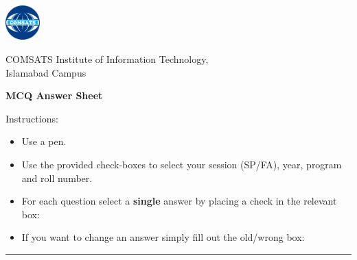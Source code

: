 \documentclass[english,a4paper,oneside]{sdaps}
\author{}
\title{}
\begin{document}

    \hspace{7em}\includegraphics[width=0.1\textwidth]{comsats-logo}         %
    \vspace{-5\baselineskip}                                    %

    \begin{center}
           {COMSATS Institute of Information Technology,\\
           Islamabad Campus}

           \vspace{\baselineskip}
           {\LARGE \bfseries MCQ Answer Sheet}\\

    \end{center}

    Instructions:

        \vspace{.5\baselineskip}
        \hspace{0.025\linewidth}\begin{minipage}{0.9\linewidth}%
            \begin{itemize}
                \item Use a pen.
                \item Use the provided check-boxes to select your session (SP/FA), year, program and roll number.
                \item For each question select a \textbf{single} answer by placing a check in the relevant box: \hspace{1em}\checkedbox
                \item If you want to change an answer simply fill out the old/wrong box: \hspace{1em}\correctedbox
            \end{itemize}
        \end{minipage}

    \vspace{-0.5\baselineskip}
    \begin{center}\rule{0.8\linewidth}{0.5pt}\end{center}
    \vspace{\baselineskip}
\end{document}
